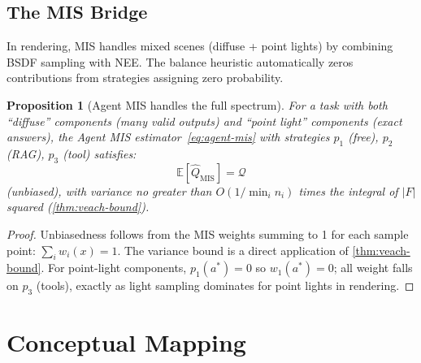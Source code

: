 \documentclass[11pt,twocolumn]{article}
\newtheorem{proposition}[theorem]{Proposition}
\theoremstyle{definition}
\newcommand{\E}{\mathbb{E}}
\begin{document}
\subsection{The MIS Bridge}\label{sec:mis-bridge}

In rendering, MIS handles mixed scenes (diffuse + point lights) by combining
BSDF sampling with NEE.
The balance heuristic automatically zeros contributions from strategies
assigning zero probability.

\begin{proposition}[Agent MIS handles the full spectrum]\label{prop:mis-spectrum}
For a task with both ``diffuse'' components (many valid outputs)
and ``point light'' components (exact answers),
the Agent MIS estimator~\eqref{eq:agent-mis} with strategies
$p_1$ (free), $p_2$ (RAG), $p_3$ (tool)
satisfies:
\begin{equation}
  \E[\hat{Q}_{\text{MIS}}] = \mathcal{Q}
\end{equation}
(unbiased), with variance no greater than $O(1/\min_i n_i)$ times the
integral of $|F|$ squared (\cref{thm:veach-bound}).
\end{proposition}

\begin{proof}
Unbiasedness follows from the MIS weights summing to 1 for each sample point:
$\sum_i w_i(x) = 1$.
The variance bound is a direct application of \cref{thm:veach-bound}.
For point-light components, $p_1(a^*) = 0$ so $w_1(a^*) = 0$;
all weight falls on $p_3$ (tools), exactly as light sampling dominates
for point lights in rendering.
\end{proof}

\section{Conceptual Mapping}\label{sec:mapping}
\end{document}
